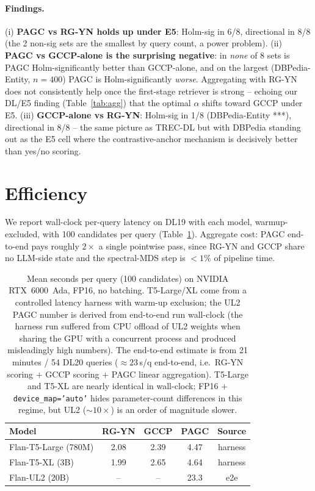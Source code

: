 \documentclass[sigconf]{acmart}
\begin{document}
\paragraph{Findings.}
(i) \textbf{PAGC vs RG-YN holds up under E5}: Holm-sig in 6/8,
directional in 8/8 (the 2 non-sig sets are the smallest by query
count, a power problem).
(ii) \textbf{PAGC vs GCCP-alone is the surprising negative}: in
\emph{none} of 8 sets is PAGC Holm-significantly better than
GCCP-alone, and on the largest (DBPedia-Entity, $n{=}400$) PAGC is
Holm-significantly \emph{worse}. Aggregating with RG-YN does not
consistently help once the first-stage retriever is strong --
echoing our DL/E5 finding (Table~\ref{tab:agg}) that the optimal
$\alpha$ shifts toward GCCP under E5.
(iii) \textbf{GCCP-alone vs RG-YN}: Holm-sig in 1/8
(DBPedia-Entity ***), directional in 8/8 -- the same picture as
TREC-DL but with DBPedia standing out as the E5 cell where the
contrastive-anchor mechanism is decisively better than yes/no
scoring.

\section{Efficiency}
\label{sec:efficiency}

We report wall-clock per-query latency on DL19 with each model,
warmup-excluded, with 100 candidates per query (Table~\ref{tab:eff}).
Aggregate cost: PAGC end-to-end pays roughly $2{\times}$ a single
pointwise pass, since RG-YN and GCCP share no LLM-side state and the
spectral-MDS step is $<1\%$ of pipeline time.

\begin{table}[t]
\centering
\small
\begin{tabular}{lcccc}
\toprule
\textbf{Model} & \textbf{RG-YN} & \textbf{GCCP} & \textbf{PAGC} & \textbf{Source} \\
\midrule
Flan-T5-Large (780M) & 2.08 & 2.39 & 4.47 & harness \\
Flan-T5-XL (3B)      & 1.99 & 2.65 & 4.64 & harness \\
Flan-UL2 (20B)       & --   & --   & 23.3 & e2e \\
\bottomrule
\end{tabular}
\caption{Mean seconds per query (100 candidates) on
NVIDIA RTX~6000~Ada, FP16, no batching. T5-Large/XL come from a
controlled latency harness with warm-up exclusion; the UL2 PAGC
number is derived from end-to-end run wall-clock (the harness run
suffered from CPU offload of UL2 weights when sharing the GPU with a
concurrent process and produced misleadingly high numbers). The
end-to-end estimate is from 21 minutes / 54 DL20 queries
($\approx 23$\,s/q end-to-end, i.e.\ RG-YN scoring $+$ GCCP scoring $+$ PAGC linear aggregation). T5-Large
and T5-XL are nearly identical in wall-clock; FP16 $+$
\texttt{device\_map='auto'} hides parameter-count differences in this
regime, but UL2 ($\sim 10\times$) is an order of magnitude slower.}
\label{tab:eff}
\end{table}
\end{document}
